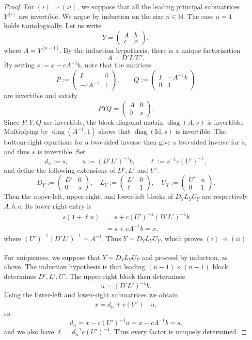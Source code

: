 \documentclass[11pt]{article}
\newcommand{\diag}{\operatorname{diag}}
\begin{document}
\begin{proof}
For $(i)\Longrightarrow(ii)$, we suppose that all the leading principal submatrices \(Y^{[r]}\) are invertible.  We argue by
induction on the size \(n\in\mathbb{N}\).  The case \(n=1\) holds tautologically. Let us write
\[
 Y=\begin{pmatrix}A&b\\ c&x\end{pmatrix},
\]
where \(A=Y^{[n-1]}\).  By the induction hypothesis, there is a unique factorization
\[
 A=D'L'U'.
\]
By setting $s:=x-cA^{-1}b$, note that the matrices
\[
 P:=\begin{pmatrix}I&0\\-cA^{-1}&1\end{pmatrix},
 \qquad
 Q:=\begin{pmatrix}I&-A^{-1}b\\0&1\end{pmatrix}
\]
are invertible and satisfy
\[
 PYQ=\begin{pmatrix}A&0\\0&s\end{pmatrix}.
\]
Since \(P,Y,Q\) are invertible, the block-diagonal matrix
\(\diag(A,s)\) is invertible.  Multiplying by
\(\diag(A^{-1},1)\) shows that \(\diag(\mbox{Id},s)\) is invertible. The
bottom-right equations for a two-sided inverse then give a two-sided
inverse for \(s\), and thus \(s\) is invertible.
Set
\[
 d_n:=s,
 \qquad
 u:=(D'L')^{-1}b,
 \qquad
 \ell:=s^{-1}c(U')^{-1},
\]
and define the following extensions of $D',L'$ and $U'$:
\[
 D_Y:=\begin{pmatrix}D'&0\\0&s\end{pmatrix},
 \quad
 L_Y:=\begin{pmatrix}L'&0\\\ell&1\end{pmatrix},
 \quad
 U_Y:=\begin{pmatrix}U'&u\\0&1\end{pmatrix}.
\]
Then the upper-left, upper-right, and lower-left blocks of
\(D_YL_YU_Y\) are respectively \(A,b,c\).  Its lower-right entry is
\begin{align*}
 s(1+\ell u)
 &=s+c(U')^{-1}(D'L')^{-1}b\\
 &=s+cA^{-1}b=x,
\end{align*}
where
\((U')^{-1}(D'L')^{-1}=A^{-1}\).  Thus \(Y=D_YL_YU_Y\), which proves  $(i)\Longrightarrow(ii)$.\\

\noindent For uniqueness, we suppose that \(Y=D_YL_YU_Y\) and proceed by induction, as above.  The induction hypothesis is that leading
\((n-1)\times(n-1)\) block determines \(D',L',U'\).  The
upper-right block then determines
\[
 u=(D'L')^{-1}b.
\]
Using the lower-left and lower-right submatrices we obtain
\[
 x=d_n+c(U')^{-1}u,
\]
so
\[
 d_n=x-c(U')^{-1}u=x-cA^{-1}b=s.
\]
and we also have $\ell=d_n^{-1}c(U')^{-1}$. Thus every factor is uniquely determined.
\end{proof}
\end{document}

